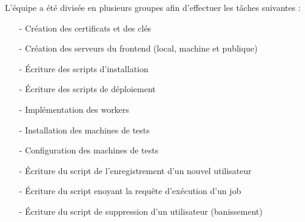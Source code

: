 L'équipe a été divisée en plusieurs groupes afin d'effectuer les tâches suivantes :

\begin{itemize}
\item[-] Création des certificats et des clés
\item[-] Création des serveurs du frontend (local, machine et publique)
\item[-] Écriture des scripts d'installation
\item[-] Écriture des scripts de déploiement
\item[-] Implémentation des workers
\item[-] Installation des machines de tests
\item[-] Configuration des machines de tests
\item[-] Écriture du script de l'enregistrement d'un nouvel utilisateur
\item[-] Écriture du script enoyant la requête d'exécution d'un job
\item[-] Écriture du script de suppression d'un utilisateur (banissement)
\end{itemize}
